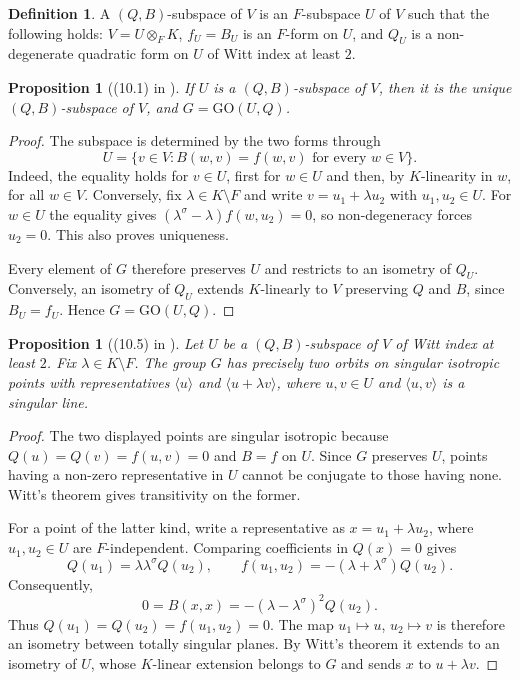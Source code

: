 \documentclass{amsart}
\newcommand{\GO}{\mathrm{GO}}
\newcommand{\s}{\sigma}
\theoremstyle{plain}
\numberwithin{theorem}{section}
\newtheorem{proposition}[theorem]{Proposition}
\theoremstyle{definition}
\newtheorem{definition}[theorem]{Definition}
\begin{document}
\begin{definition}
	\label{def:qb_subspace}
	A $(Q,B)$-subspace of $V$ is an $F$-subspace $U$ of $V$ such that the following holds: \mbox{$V = U \otimes_F K$}, 
	$f_U = B_U$ is an $F$-form on $U$, and $Q_U$ is a non-degenerate quadratic form on $U$ of 
	Witt index at least $2$. 
\end{definition}

\begin{proposition}[(10.1) in \cite{Asch1}]
	\label{prop:3_2forms}
	If $U$ is a $(Q,B)$-subspace of $V$, then it is the unique $(Q,B)$-subspace of $V$, and
	$G = \GO(U,Q)$.
\end{proposition}

\begin{proof}
	The subspace is determined by the two forms through
	\[
		U=\{v\in V:B(w,v)=f(w,v)\text{ for every }w\in V\}.
	\]
	Indeed, the equality holds for $v\in U$, first for $w\in U$ and then,
	by $K$-linearity in $w$, for all $w\in V$. Conversely, fix
	$\lambda\in K\setminus F$ and write $v=u_1+\lambda u_2$ with $u_1,u_2\in U$.
	For $w\in U$ the equality gives
	$(\lambda^{\s}-\lambda)f(w,u_2)=0$, so non-degeneracy forces $u_2=0$.
	This also proves uniqueness.

	Every element of $G$ therefore preserves $U$ and restricts to an isometry
	of $Q_U$. Conversely, an isometry of $Q_U$ extends $K$-linearly to $V$
	preserving $Q$ and $B$, since $B_U=f_U$. Hence $G=\GO(U,Q)$.
\end{proof}

\begin{proposition}[(10.5) in \cite{Asch1}]
	\label{prop:3_2forms_orbits}
	Let $U$ be a $(Q,B)$-subspace of $V$ of Witt index at least $2$. Fix
	\mbox{$\lambda \in K \setminus F$}. The group $G$ has
	precisely two orbits on singular isotropic points with representatives
	$\langle u \rangle$ and \mbox{$\langle u + \lambda v \rangle$}, where $u,v \in U$ and
	\mbox{$\langle u, v \rangle$} is a singular line.
\end{proposition}

\begin{proof}
	The two displayed points are singular isotropic because
	$Q(u)=Q(v)=f(u,v)=0$ and $B=f$ on $U$.
	Since $G$ preserves $U$, points having a non-zero representative in $U$
	cannot be conjugate to those having none. Witt's theorem gives
	transitivity on the former.

	For a point of the latter kind, write a representative as
	$x=u_1+\lambda u_2$, where $u_1,u_2\in U$ are $F$-independent.
	Comparing coefficients in $Q(x)=0$ gives
	\[
		Q(u_1)=\lambda\lambda^{\s}Q(u_2),\qquad
		f(u_1,u_2)=-(\lambda+\lambda^{\s})Q(u_2).
	\]
	Consequently,
	\[
		0=B(x,x)=-(\lambda-\lambda^{\s})^2Q(u_2).
	\]
	Thus $Q(u_1)=Q(u_2)=f(u_1,u_2)=0$.
	The map $u_1\mapsto u$, $u_2\mapsto v$ is therefore an isometry between
	totally singular planes. By Witt's theorem it extends to an isometry
	of $U$, whose $K$-linear extension belongs to $G$ and sends $x$ to
	$u+\lambda v$.
\end{proof}
\end{document}
